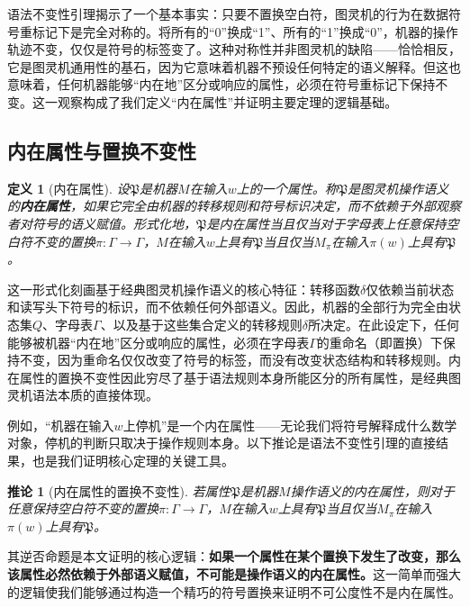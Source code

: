 \documentclass{ctexart}
\newtheorem{corollary}[theorem]{推论}
\newtheorem{definition}[theorem]{定义}
\begin{document}
	语法不变性引理揭示了一个基本事实：只要不置换空白符，图灵机的行为在数据符号重标记下是完全对称的。将所有的``0''换成``1''、所有的``1''换成``0''，机器的操作轨迹不变，仅仅是符号的标签变了。这种对称性并非图灵机的缺陷——恰恰相反，它是图灵机通用性的基石，因为它意味着机器不预设任何特定的语义解释。但这也意味着，任何机器能够``内在地''区分或响应的属性，必须在符号重标记下保持不变。这一观察构成了我们定义``内在属性''并证明主要定理的逻辑基础。
	
	\subsection{内在属性与置换不变性}
	
	\begin{definition}[内在属性]\label{def:intrinsic}
		设$\mathfrak{P}$是机器$M$在输入$w$上的一个属性。称$\mathfrak{P}$是图灵机操作语义的\textbf{内在属性}，如果它完全由机器的转移规则和符号标识决定，而不依赖于外部观察者对符号的语义赋值。形式化地，$\mathfrak{P}$是内在属性当且仅当对于字母表上任意保持空白符不变的置换$\pi: \Gamma \to \Gamma$，$M$在输入$w$上具有$\mathfrak{P}$当且仅当$M_\pi$在输入$\pi(w)$上具有$\mathfrak{P}$。
	\end{definition}
	
	这一形式化刻画基于经典图灵机操作语义的核心特征：转移函数$\delta$仅依赖当前状态和读写头下符号的标识，而不依赖任何外部语义。因此，机器的全部行为完全由状态集$Q$、字母表$\Gamma$、以及基于这些集合定义的转移规则$\delta$所决定。在此设定下，任何能够被机器``内在地''区分或响应的属性，必须在字母表$\Gamma$的重命名（即置换）下保持不变，因为重命名仅仅改变了符号的标签，而没有改变状态结构和转移规则。内在属性的置换不变性因此穷尽了基于语法规则本身所能区分的所有属性，是经典图灵机语法本质的直接体现。
	
	例如，``机器在输入$w$上停机''是一个内在属性——无论我们将符号解释成什么数学对象，停机的判断只取决于操作规则本身。以下推论是语法不变性引理的直接结果，也是我们证明核心定理的关键工具。
	
	\begin{corollary}[内在属性的置换不变性]\label{cor:intrinsic}
		若属性$\mathfrak{P}$是机器$M$操作语义的内在属性，则对于任意保持空白符不变的置换$\pi: \Gamma \to \Gamma$，$M$在输入$w$上具有$\mathfrak{P}$当且仅当$M_\pi$在输入$\pi(w)$上具有$\mathfrak{P}$。
	\end{corollary}
	
	其逆否命题是本文证明的核心逻辑：\textbf{如果一个属性在某个置换下发生了改变，那么该属性必然依赖于外部语义赋值，不可能是操作语义的内在属性。}这一简单而强大的逻辑使我们能够通过构造一个精巧的符号置换来证明不可公度性不是内在属性。
	
\end{document}
